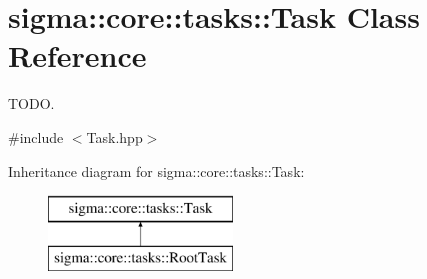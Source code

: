\hypertarget{classsigma_1_1core_1_1tasks_1_1_task}{\section{sigma\-:\-:core\-:\-:tasks\-:\-:Task Class Reference}
\label{classsigma_1_1core_1_1tasks_1_1_task}
}


T\-O\-D\-O.  




{\ttfamily \#include $<$Task.\-hpp$>$}

Inheritance diagram for sigma\-:\-:core\-:\-:tasks\-:\-:Task\-:\begin{figure}[H]
\begin{center}
\leavevmode
\includegraphics[height=2.000000cm]{classsigma_1_1core_1_1tasks_1_1_task}
\end{center}
\end{figure}
